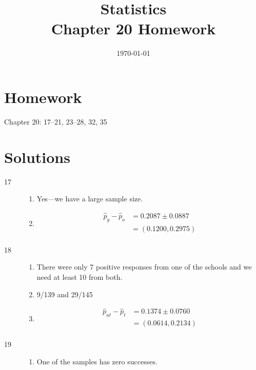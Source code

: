 \documentclass[letterpaper]{exam}
\title{Statistics \\ Chapter 20 Homework}
\date{\today}
\author{}
\begin{document}
  \maketitle

  \section{Homework}
  Chapter 20: 17--21, 23--28, 32, 35

  \ifprintanswers{}
    \section{Solutions}
    \begin{description}

      \item[17] 
        \begin{enumerate}[label = ({\alph*})]
          \item Yes---we have a large sample size.

          \item 
            \begin{align*}
              \hat{p}_{y} - \hat{p}_{o} & = 0.2087 \pm 0.0887 \\
                                        & = (0.1200, 0.2975) \\
            \end{align*}
        \end{enumerate}

      \item[18]
        \begin{enumerate}[label = ({\alph*})]
          \item There were only 7 positive responses from one of the schools and we
            need at least 10 from both.

          \item 9/139 and 29/145

          \item 
            \begin{align*}
              \hat{p}_{ut} - \hat{p}_{t} & = 0.1374 \pm 0.0760 \\
                                         & = (0.0614, 0.2134) \\
            \end{align*}
        \end{enumerate}

      \item[19]
        \begin{enumerate}[label = ({\alph*})]
          \item One of the samples has zero successes.


\end{enumerate}
\end{description}
\end{document}
